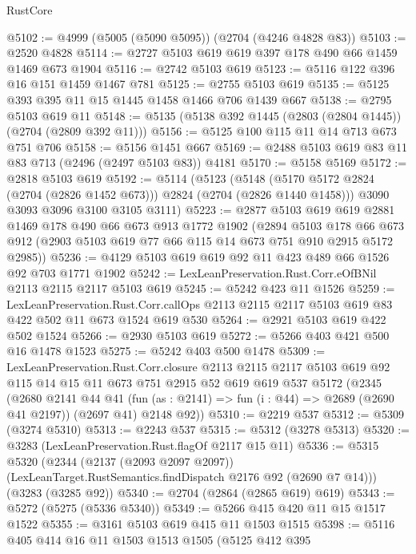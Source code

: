 \begin{lexlean}{RustCore}
\begin{coremodule}
@5102 := @4999 (@5005 (@5090 @5095)) (@2704 (@4246 @4828 @83))
@5103 := @2520 @4828
@5114 := @2727 @5103 @619 @619 @397 @178 @490 @66 @1459 @1469 @673 @1904
@5116 := @2742 @5103 @619
@5123 := @5116 @122 @396 @16 @151 @1459 @1467 @781
@5125 := @2755 @5103 @619
@5135 := @5125 @393 @395 @11 @15 @1445 @1458 @1466 @706 @1439 @667
@5138 := @2795 @5103 @619 @11
@5148 := @5135 (@5138 @392 @1445 (@2803 (@2804 @1445)) (@2704 (@2809 @392 @11)))
@5156 := @5125 @100 @115 @11 @14 @713 @673 @751 @706
@5158 := @5156 @1451 @667
@5169 := @2488 @5103 @619 @83 @11 @83 @713 (@2496 (@2497 @5103 @83)) @4181
@5170 := @5158 @5169
@5172 := @2818 @5103 @619
@5192 := @5114
    (@5123
      (@5148 (@5170 @5172 @2824 (@2704 (@2826 @1452 @673))) @2824 (@2704 (@2826 @1440 @1458)))
      @3090
      @3093
      @3096
      @3100
      @3105
      @3111)
@5223 := @2877
    @5103
    @619
    @619
    @2881
    @1469
    @178
    @490
    @66
    @673
    @913
    @1772
    @1902
    (@2894
      @5103
      @178
      @66
      @673
      @912
      (@2903 @5103 @619 @77 @66 @115 @14 @673 @751 @910 @2915 @5172 @2985))
@5236 := @4129 @5103 @619 @619 @92 @11 @423 @489 @66 @1526 @92 @703 @1771 @1902
@5242 := LexLeanPreservation.Rust.Corr.eOfBNil @2113 @2115 @2117 @5103 @619
@5245 := @5242 @423 @11 @1526
@5259 := LexLeanPreservation.Rust.Corr.callOps
    @2113
    @2115
    @2117
    @5103
    @619
    @83
    @422
    @502
    @11
    @673
    @1524
    @619
    @530
@5264 := @2921 @5103 @619 @422 @502 @1524
@5266 := @2930 @5103 @619
@5272 := @5266 @403 @421 @500 @16 @1478 @1523
@5275 := @5242 @403 @500 @1478
@5309 := LexLeanPreservation.Rust.Corr.closure
    @2113
    @2115
    @2117
    @5103
    @619
    @92
    @115
    @14
    @15
    @11
    @673
    @751
    @2915
    @52
    @619
    @619
    @537
    @5172
    (@2345
      (@2680
        @2141
        @44
        @41
        (fun (as : @2141) => fun (i : @44) => @2689 (@2690 @41 @2197))
        (@2697 @41)
        @2148
        @92))
@5310 := @2219 @537
@5312 := @5309 (@3274 @5310)
@5313 := @2243 @537
@5315 := @5312 (@3278 @5313)
@5320 := @3283 (LexLeanPreservation.Rust.flagOf @2117 @15 @11)
@5336 := @5315
    @5320
    (@2344
      (@2137 (@2093 @2097 @2097))
      (LexLeanTarget.RustSemantics.findDispatch @2176 @92 (@2690 @7 @14)))
    (@3283 (@3285 @92))
@5340 := @2704 (@2864 (@2865 @619) @619)
@5343 := @5272 (@5275 (@5336 @5340))
@5349 := @5266 @415 @420 @11 @15 @1517 @1522
@5355 := @3161 @5103 @619 @415 @11 @1503 @1515
@5398 := @5116
    @405
    @414
    @16
    @11
    @1503
    @1513
    @1505
    (@5125
      @412
      @395

\end{coremodule}
\end{lexlean}
